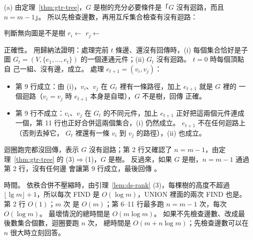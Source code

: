 (a) 由定理~\ref{thm:gtr-tree}，$G$ 是樹的充分必要條件是「$G$ 沒有迴路，而且 $n = m - 1$」。
所以先檢查邊數，再用互斥集合檢查有沒有迴路：

\begin{pseudo}[label=alg:ds-px-tree, unbreakable]{判斷無向圖是不是樹}
        \State \Return \FALSE
    \EndIf
        \State {}
    \EndFor
        \State $r_i \gets$ 
        \State $r_j \gets$ 
            \State \Return \FALSE {}
        \EndIf
        \State {}
    \EndFor
    \State \Return \TRUE
\EndFunction
\end{pseudo}

正確性。 用歸納法證明：處理完前 $t$ 條邊、還沒有回傳時，(i) 每個集合恰好是子圖
$G_t = (V, \{e_1, \ldots, e_t\})$ 的一個連通元件；(ii) $G_t$ 沒有迴路。 $t = 0$ 時每個頂點自
己一組、沒有邊，成立。 處理 $e_{t+1} = (v_i, v_j)$：
\begin{itemize}
\item 第 9 行成立：由 (i)，$v_i$、$v_j$ 在 $G_t$ 裡有一條路徑，加上 $e_{t+1}$ 就是 $G$ 裡的
一個迴路（$v_i = v_j$ 時 $e_{t+1}$ 本身是自環），$G$ 不是樹，回傳 \FALSE{} 正確。
\item 第 9 行不成立：$v_i$、$v_j$ 在 $G_t$ 的不同元件，加上 $e_{t+1}$ 正好把這兩個元件連成
一個，第 11 行也正好合併這兩個集合，(i) 仍然成立。 $e_{t+1}$ 不在任何迴路上（否則去掉它，
$G_t$ 裡還有一條 $v_i$ 到 $v_j$ 的路徑），(ii) 也成立。
\end{itemize}
迴圈跑完都沒回傳，表示 $G$ 沒有迴路；第 2 行又確認了 $n = m - 1$，由定理~\ref{thm:gtr-tree}
的 (3)$\Rightarrow$(1)，$G$ 是樹。 反過來，如果 $G$ 是樹，$n = m - 1$ 通過第 2 行，沒有任何邊
會讓第 9 行成立，最後回傳 \TRUE。

時間。 依秩合併不壓縮時，由引理~\ref{lem:ds-rank} (3)，每棵樹的高度不超過
$\lfloor \lg m \rfloor + 1$，所以每次 FIND 是 $O(\log m)$，UNION 裡面的兩次 FIND 也是。 第 2 行
$O(1)$；$m$ 次  是 $O(m)$；第 6--11 行最多跑 $n = m - 1$ 次，每次 $O(\log m)$。
最壞情況的總時間是 $O(m \log m)$。 如果不先檢查邊數、改成最後數集合個數，迴圈要跑 $n$ 次，
總時間是 $O(m + n \log m)$；先檢查邊數可以在 $n$ 很大時立刻回答。

